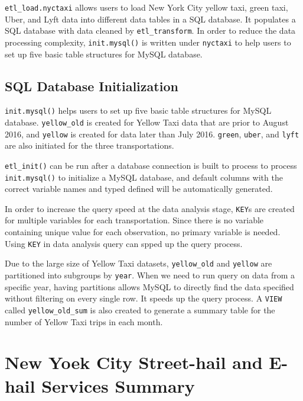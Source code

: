 \documentclass[12pt,twoside]{reedthesis}
\newenvironment{Shaded}{\begin{snugshade}}{\end{snugshade}}
\newcommand{\KeywordTok}[1]{\textcolor[rgb]{0.13,0.29,0.53}{\textbf{#1}}}
\newcommand{\StringTok}[1]{\textcolor[rgb]{0.31,0.60,0.02}{#1}}
\newcommand{\OperatorTok}[1]{\textcolor[rgb]{0.81,0.36,0.00}{\textbf{#1}}}
\newcommand{\NormalTok}[1]{#1}
\theoremstyle{definition}
\theoremstyle{definition}
\theoremstyle{definition}
\theoremstyle{remark}
\begin{document}
\texttt{etl\_load.nyctaxi} allows users to load New York City yellow
taxi, green taxi, Uber, and Lyft data into different data tables in a
SQL database. It populates a SQL database with data cleaned by
\texttt{etl\_transform}. In order to reduce the data processing
complexity, \texttt{init.mysql()} is written under \texttt{nyctaxi} to
help users to set up five basic table structures for MySQL database.

\subsection{SQL Database
Initialization}\label{sql-database-initialization}

\texttt{init.mysql()} helps users to set up five basic table structures
for MySQL database. \texttt{yellow\_old} is created for Yellow Taxi data
that are prior to August 2016, and \texttt{yellow} is created for data
later than July 2016. \texttt{green}, \texttt{uber}, and \texttt{lyft}
are also initiated for the three transportations.

\texttt{etl\_init()} can be run after a database connection is built to
process to process \texttt{init.mysql()} to initialize a MySQL database,
and default columns with the correct variable names and typed defined
will be automatically generated.
\begin{Shaded}
\end{Shaded}
In order to increase the query speed at the data analysis stage,
\texttt{KEY}s are created for multiple variables for each
transportation. Since there is no variable containing unique value for
each observation, no primary variable is needed. Using \texttt{KEY} in
data analysis query can spped up the query process.

Due to the large size of Yellow Taxi datasets, \texttt{yellow\_old} and
\texttt{yellow} are partitioned into subgroups by \texttt{year}. When we
need to run query on data from a specific year, having partitions allows
MySQL to directly find the data specified without filtering on every
single row. It speeds up the query process. A \texttt{VIEW} called
\texttt{yellow\_old\_sum} is also created to generate a summary table
for the number of Yellow Taxi trips in each month.

\section{New Yoek City Street-hail and E-hail Services
Summary}\label{new-yoek-city-street-hail-and-e-hail-services-summary}
\end{document}
